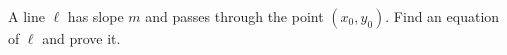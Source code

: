 A line $\ell$ has slope $m$ and passes through the point $(x_0,y_0)$. Find an equation of $\ell$ and prove it.
